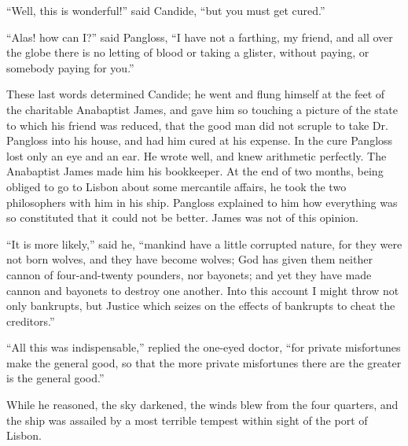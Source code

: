 ``Well, this is wonderful!'' said Candide, ``but you must get cured.''

``Alas! how can I?'' said Pangloss, ``I have not a farthing, my friend, and all over the globe there is no letting of blood or taking a glister, without paying, or somebody paying for you.''

These last words determined Candide; he went and flung himself at the feet of the charitable Anabaptist James, and gave him so touching a picture of the state to which his friend was reduced, that the good man did not scruple to take Dr. Pangloss into his house, and had him cured at his expense. In the cure Pangloss lost only an eye and an ear. He wrote well, and knew arithmetic perfectly. The Anabaptist James made him his bookkeeper. At the end of two months, being obliged to go to Lisbon about some mercantile affairs, he took the two philosophers with him in his ship. Pangloss explained to him how everything was so constituted that it could not be better. James was not of this opinion.

``It is more likely,'' said he, ``mankind have a little corrupted nature, for they were not born wolves, and they have become wolves; God has given them neither cannon of four-and-twenty pounders, nor bayonets; and yet they have made cannon and bayonets to destroy one another. Into this account I might throw not only bankrupts, but Justice which seizes on the effects of bankrupts to cheat the creditors.''

``All this was indispensable,'' replied the one-eyed doctor, ``for private misfortunes make the general good, so that the more private misfortunes there are the greater is the general good.''

While he reasoned, the sky darkened, the winds blew from the four quarters, and the ship was assailed by a most terrible tempest within sight of the port of Lisbon.

